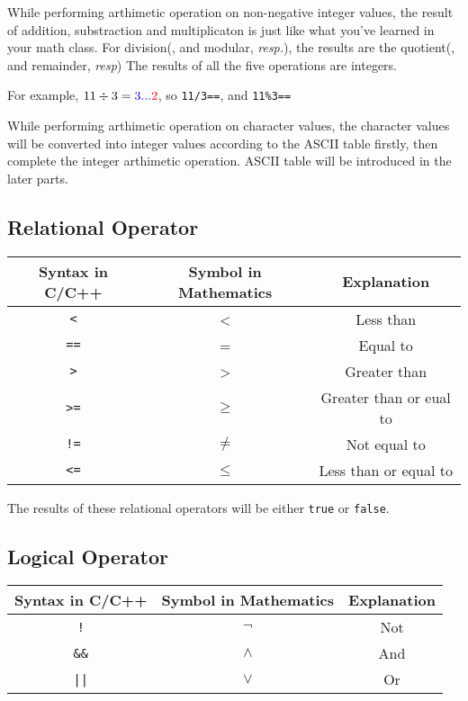 \documentclass{report}
\begin{document}
    While performing arthimetic operation on non-negative integer values, the result of addition, substraction and multiplicaton is just like what you've learned in your math class. For division(, and modular, \textit{resp.}), the results are the quotient(, and remainder, \textit{resp}) The results of all the five operations are integers.

    For example, $11\div3=\color{blue}{3}...\color{red}{2}$, so \texttt{11/3==\color{blue}{3}}, and \texttt{11\%3==\color{red}{2}}

    While performing arthimetic operation on character values, the character values will be converted into integer values according to the ASCII table firstly, then complete the integer arthimetic operation. ASCII table will be introduced in the later parts.

    \subsection{Relational Operator}
    \begin{tabular}{|c|c|c|}
    Syntax in C/C++ &   Symbol in Mathematics  &    Explanation\\
    \hline
    \texttt{<}               &   <                      &    Less than\\
    \texttt{==}              &   =                      &    Equal to\\
    \texttt{>}               &   >                      &    Greater than\\
    \texttt{>=}              &   $\geq$                 &    Greater than or eual to\\
    \texttt{!=}              &   $\neq$                 &    Not equal to\\
    \texttt{<=}              &   $\leq$                 &    Less than or equal to\\
    \end{tabular}

    The results of these relational operators will be either \texttt{true} or \texttt{false}.

    \subsection{Logical Operator}
    \begin{tabular}{|c|c|c|}
    Syntax in C/C++ &   Symbol in Mathematics  &    Explanation\\
    \hline
    \texttt{!}               &   $\neg$                 &    Not\\
    \texttt{\&\&}            &   $\land$                &    And\\
    \texttt{||}              &   $\lor$                 &    Or\\
    \end{tabular}
\end{document}
